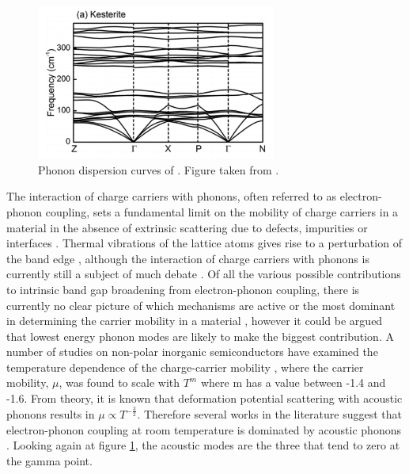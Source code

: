 \begin{figure}[h!]
  \centering
    \includegraphics[width=0.7\textwidth]{figures/CZTS_phonons.png}
    \caption{Phonon dispersion curves of {\CZTS}.  Figure taken from .}
  \label{CZTS_phonons}
\end{figure}

The interaction of charge carriers with phonons, often referred to as electron-phonon coupling, sets a fundamental limit on the mobility of charge carriers in a material in the absence of extrinsic scattering due to defects, impurities or interfaces \cite{fund_semi, MAPI_Eg_broadening}. 
Thermal vibrations of the lattice atoms gives rise to a perturbation of the band edge \cite{thin_film_Boer}, although the interaction of charge carriers with phonons is currently still a subject of much debate \cite{MAPI_Eg_broadening16, MAPI_Eg_broadening17, MAPI_Eg_broadening}.
Of all the various possible contributions to intrinsic band gap broadening from electron-phonon coupling, there is currently no clear picture of which mechanisms are active or the most dominant in determining the carrier mobility in a material \cite{MAPI_Eg_broadening}, however it could be argued that lowest energy phonon modes are likely to make the biggest contribution. A number of studies on non-polar inorganic semiconductors have examined the temperature dependence of the charge-carrier mobility \cite{MAPI_Eg_broadening21, MAPI_Eg_broadening22, MAPI_Eg_broadening23, MAPI_Eg_broadening24}, where the carrier mobility, $\mu$, was found to scale with $T^m$ where m has a value between -1.4 and -1.6. From theory, it is known that deformation potential scattering with acoustic phonons results in $\mu \propto T^{-\frac{3}{2}}$. Therefore several works in the literature suggest that electron-phonon coupling at room temperature is dominated by acoustic phonons \cite{MAPI_Eg_broadening16, MAPI_Eg_broadening17, MAPI_Eg_broadening24}. Looking again at figure \ref{CZTS_phonons}, the acoustic modes are the three that tend to zero at the gamma point.\\

